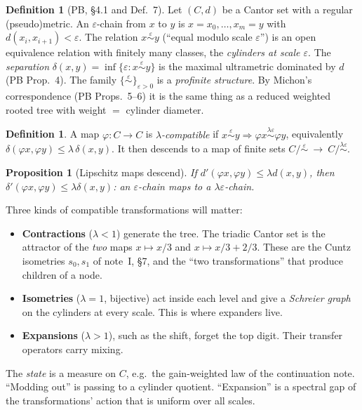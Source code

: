 \documentclass[11pt]{article}
\newtheorem{proposition}[theorem]{Proposition}
\theoremstyle{definition}
\newtheorem{definition}[theorem]{Definition}
\theoremstyle{remark}
\begin{document}
\begin{definition}[PB, \S4.1 and Def.~7]
Let $(C,d)$ be a Cantor set with a regular (pseudo)metric. An $\varepsilon$-chain from $x$ to $y$ is $x=x_0,\dots,x_m=y$ with $d(x_i,x_{i+1})<\varepsilon$. The relation $x\overset\varepsilon\sim y$ (``equal modulo scale $\varepsilon$'') is an open equivalence relation with finitely many classes, the \emph{cylinders at scale $\varepsilon$}. The \emph{separation} $\delta(x,y)=\inf\{\varepsilon:x\overset\varepsilon\sim y\}$ is the maximal ultrametric dominated by $d$ (PB Prop.~4). The family $\{\overset\varepsilon\sim\}_{\varepsilon>0}$ is a \emph{profinite structure}. By Michon's correspondence (PB Props.~5--6) it is the same thing as a reduced weighted rooted tree with weight $=$ cylinder diameter.
\end{definition}

\begin{definition}
A map $\varphi:C\to C$ is \emph{$\lambda$-compatible} if $x\overset\varepsilon\sim y\Rightarrow\varphi x\overset{\lambda\varepsilon}\sim\varphi y$, equivalently $\delta(\varphi x,\varphi y)\le\lambda\,\delta(x,y)$. It then descends to a map of finite sets $C/\!\overset\varepsilon\sim\ \to\ C/\!\overset{\lambda\varepsilon}\sim$.
\end{definition}

\begin{proposition}[Lipschitz maps descend]\label{prop:descend}
If $d'(\varphi x,\varphi y)\le\lambda d(x,y)$, then $\delta'(\varphi x,\varphi y)\le\lambda\delta(x,y)$: an $\varepsilon$-chain maps to a $\lambda\varepsilon$-chain.
\end{proposition}

Three kinds of compatible transformations will matter:
\begin{itemize}
\item \textbf{Contractions} ($\lambda<1$) generate the tree. The triadic Cantor set is the attractor of the \emph{two} maps $x\mapsto x/3$ and $x\mapsto x/3+2/3$. These are the Cuntz isometries $s_0,s_1$ of note~I, \S7, and the ``two transformations'' that produce children of a node.
\item \textbf{Isometries} ($\lambda=1$, bijective) act inside each level and give a \emph{Schreier graph} on the cylinders at every scale. This is where expanders live.
\item \textbf{Expansions} ($\lambda>1$), such as the shift, forget the top digit. Their transfer operators carry mixing.
\end{itemize}
The \emph{state} is a measure on $C$, e.g.\ the gain-weighted law of the continuation note. ``Modding out'' is passing to a cylinder quotient. ``Expansion'' is a spectral gap of the transformations' action that is uniform over all scales.
\end{document}
